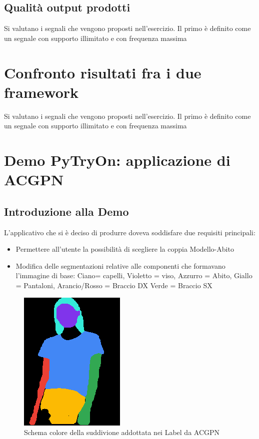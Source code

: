 \documentclass[final, 11pt]{article}
\begin{document}
	\subsection{Qualità output prodotti}
	Si valutano i segnali che vengono proposti nell'esercizio. Il primo è definito come un segnale con supporto illimitato e con frequenza massima 
	
	\newpage
	\section{Confronto risultati fra i due framework}	
	Si valutano i segnali che vengono proposti nell'esercizio. Il primo è definito come un segnale con supporto illimitato e con frequenza massima 
	
	\newpage
	\section{Demo PyTryOn: applicazione di ACGPN}
	\subsection{Introduzione alla Demo}
	L’applicativo che si è deciso di produrre doveva soddisfare due requisiti principali:
	\begin{itemize}
		\item Permettere all’utente la possibilità di scegliere la coppia Modello-Abito
		\item Modifica delle segmentazioni relative alle componenti che formavano l’immagine di base:
		Ciano= capelli, Violetto = viso, Azzurro = Abito, Giallo = Pantaloni, Arancio/Rosso = Braccio DX
		Verde = Braccio SX
	\end{itemize}

	\begin{figure}[!htb]
		\begin{center}
			\includegraphics[scale=.7]{002474_0.png}
		\end{center} \caption{Schema colore della suddivione addottata nei Label da ACGPN}
	\end{figure} 
	
\end{document}
